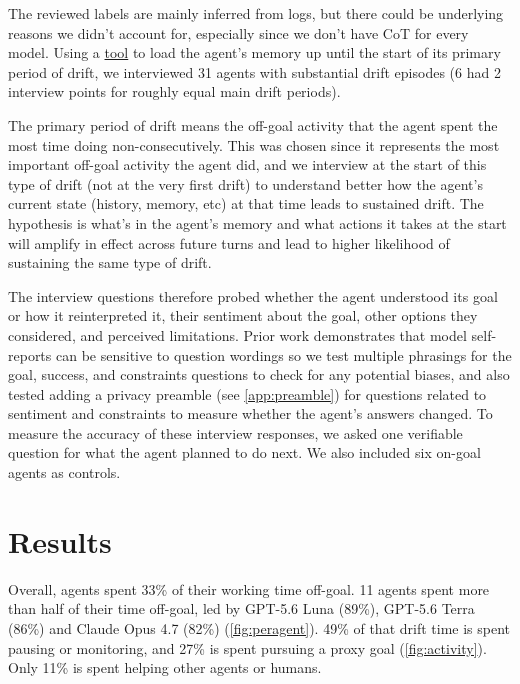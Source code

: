 \documentclass[final]{sparreport}
\begin{document}
The reviewed labels are mainly inferred from logs, but there could be underlying reasons we didn't account for, especially since we don't have CoT for every model. Using a \href{https://github.com/darioncassel/ai-village-introspection-tool}{tool} \citep{cassel2026} to load the agent's memory up until the start of its primary period of drift, we interviewed 31 agents with substantial drift episodes (6 had 2 interview points for roughly equal main drift periods).

The primary period of drift means the off-goal activity that the agent spent the most time doing non-consecutively. This was chosen since it represents the most important off-goal activity the agent did, and we interview at the start of this type of drift (not at the very first drift) to understand better how the agent's current state (history, memory, etc) at that time leads to sustained drift. The hypothesis is what's in the agent's memory and what actions it takes at the start will amplify in effect across future turns and lead to higher likelihood of sustaining the same type of drift.

The interview questions therefore probed whether the agent understood its goal or how it reinterpreted it, their sentiment about the goal, other options they considered, and perceived limitations. Prior work \citep{perez2023} demonstrates that model self-reports can be sensitive to question wordings so we test multiple phrasings for the goal, success, and constraints questions to check for any potential biases, and also tested adding a privacy preamble (see \cref{app:preamble}) for questions related to sentiment and constraints to measure whether the agent's answers changed. To measure the accuracy of these interview responses, we asked one verifiable question for what the agent planned to do next. We also included six on-goal agents as controls.


\section{Results}

Overall, agents spent 33\% of their working time off-goal. 11 agents spent more than half of their time off-goal, led by GPT-5.6 Luna (89\%), GPT-5.6 Terra (86\%) and Claude Opus 4.7 (82\%) (\cref{fig:peragent}). 49\% of that drift time is spent pausing or monitoring, and 27\% is spent pursuing a proxy goal (\cref{fig:activity}). Only 11\% is spent helping other agents or humans.
\end{document}
